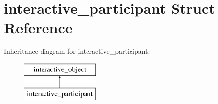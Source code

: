 \hypertarget{structinteractive__participant}{}\section{interactive\+\_\+participant Struct Reference}
\label{structinteractive__participant}
Inheritance diagram for interactive\+\_\+participant\+:\begin{figure}[H]
\begin{center}
\leavevmode
\includegraphics[height=2.000000cm]{structinteractive__participant}
\end{center}
\end{figure}
